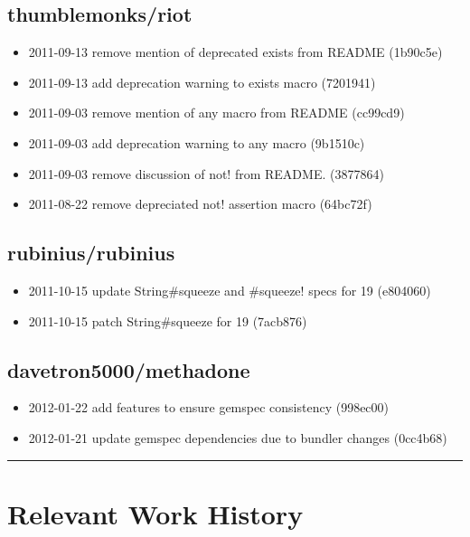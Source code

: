 \documentclass{article}
\begin{document}
\begin{multicols}{2}
  \begin{raggedright}
  \subsection{thumblemonks/riot} %
  \label{sub:thumblemonks/riot}

  \begin{itemize}
    \item2011-09-13 remove mention of deprecated exists from README (1b90c5e)
    \item2011-09-13 add deprecation warning to exists macro (7201941)
    \item2011-09-03 remove mention of any macro from README (cc99cd9)
    \item2011-09-03 add deprecation warning to any macro (9b1510c)
    \item2011-09-03 remove discussion of not! from README. (3877864)
    \item2011-08-22 remove depreciated not! assertion macro (64bc72f)
  \end{itemize}

  \subsection{rubinius/rubinius} %
  \label{sub:rubinius/rubinius}

  \begin{itemize}
    \item2011-10-15 update String#squeeze and #squeeze! specs for 19 (e804060)
    \item2011-10-15 patch String#squeeze for 19 (7acb876)
  \end{itemize}
  
  \subsection{davetron5000/methadone} %
  \label{sub:davetron5000/methadone}
  
  \begin{itemize}
    \item2012-01-22 add features to ensure gemspec consistency (998ec00)
    \item2012-01-21 update gemspec dependencies due to bundler changes (0cc4b68)
  \end{itemize}

  \end{raggedright}
\end{multicols}

\hrule
\section{Relevant Work History} %
\label{sec:Relevant Work History}
\end{document}
